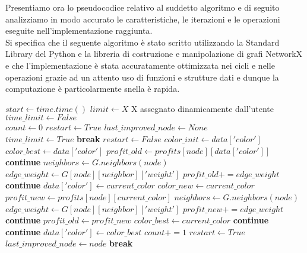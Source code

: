 Presentiamo ora lo pseudocodice relativo al suddetto algoritmo e di seguito analizziamo in modo accurato le caratteristiche, le iterazioni e le operazioni eseguite nell'implementazione raggiunta.\\

Si specifica che il seguente algoritmo è stato scritto utilizzando la Standard Library del Python e la libreria di costruzione e manipolazione di grafi NetworkX e che l'implementazione è stata accuratamente ottimizzata nei cicli e nelle operazioni grazie ad un attento uso di funzioni e strutture dati e dunque la computazione è particolarmente snella è rapida.\\

\newpage
\begin{algorithmic}

\State $start\gets time.time()$
\State $limit\gets X$ \Comment X assegnato dinamicamente dall'utente
\State $time\_limit\gets False$ \\

\State $count\gets 0$
\State $restart\gets True$
\State $last\_improved\_node\gets None$\\

		\State $time\_limit\gets True$ 
		\State \textbf{break}
	\EndIf
	\State $restart\gets False$
		\State $color\_init\gets data['color']$
		\State $color\_best\gets data['color']$
		\State $profit\_old\gets profits[node][data['color']]$
			\State \textbf{continue}
		\EndIf
		\State $neighbors\gets G.neighbors(node)$
				\State $edge\_weight\gets G[node][neighbor]['weight']$
				\State $profit\_old += edge\_weight$
			\Else
				\State \textbf{continue}
			\EndIf
		\EndFor
				\State $data['color']\gets current\_color$
				\State $color\_new\gets current\_color$
				\State $profit\_new\gets profits[node][current\_color]$
				\State $neighbors\gets G.neighbors(node)$
						\State $edge\_weight\gets G[node][neighbor]['weight']$
						\State $profit\_new += edge\_weight$
					\Else
						\State \textbf{continue}
					\EndIf
						\State $profit\_old\gets profit\_new$
						\State $color\_best\gets current\_color$
					\Else
						\State \textbf{continue}
					\EndIf
				\EndFor
			\Else
				\State \textbf{continue}
			\EndIf
		\EndFor
		\State $data['color']\gets color\_best$
			\State $count += 1$
			\State $restart\gets True$
			\State $last\_improved\_node\gets node$
			\State \textbf{break}
		\EndIf
	\EndFor
\EndWhile \\


\end{algorithmic}
